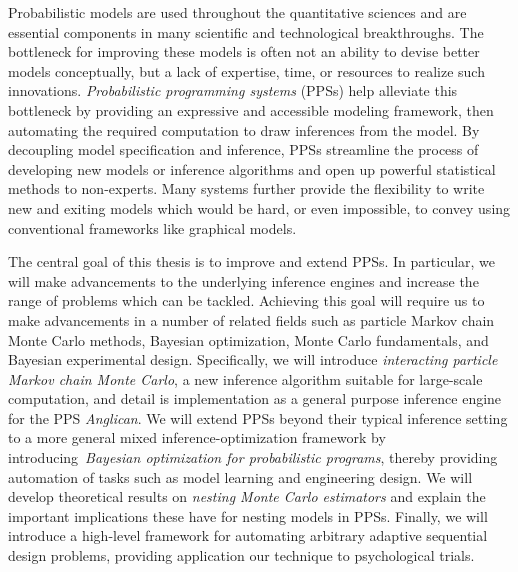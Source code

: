 
\vspace{20pt}
Probabilistic models are used throughout the quantitative sciences and are essential components 
in many scientific and technological breakthroughs.  The bottleneck for improving these models
is often not an ability to devise better models conceptually,  but a lack of expertise,
time, or resources to realize such innovations.
\emph{Probabilistic programming systems} (PPSs) help alleviate this bottleneck 
by providing an expressive and accessible modeling framework,
 then
automating the required computation to draw inferences from the model.
By decoupling model specification and inference, PPSs 
streamline the process of developing new models or inference algorithms
and open up powerful statistical methods to non-experts.
Many systems further provide
the flexibility to write new and exiting models which would be hard, or even impossible, to convey using conventional frameworks like graphical models.

The central goal of this thesis is to improve and extend PPSs.  In particular, we will
make advancements to the underlying inference engines and increase the
range of problems which can be tackled.  Achieving this goal will require us to make
advancements in a number of related fields such as particle Markov chain Monte Carlo methods,
Bayesian optimization, Monte Carlo fundamentals, and Bayesian experimental design.
Specifically, we will introduce \emph{interacting particle
	Markov chain Monte Carlo},
a new inference algorithm suitable for large-scale computation, and 
detail is implementation as a general purpose inference engine for the PPS \emph{Anglican}. 
We will extend PPSs beyond their typical inference setting
to a more general mixed inference-optimization framework by introducing~\emph{Bayesian
	optimization for probabilistic programs}, thereby providing automation of tasks
such as model learning and engineering design.
We will develop theoretical 
results on \emph{nesting Monte Carlo
	estimators} and explain the important implications these have for nesting models in PPSs.
Finally, we will 
introduce a high-level framework for automating arbitrary adaptive sequential design problems, 
providing application our technique to psychological trials.
